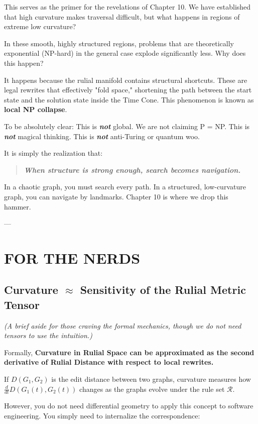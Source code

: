 This serves as the primer for the revelations of Chapter 10. We have established that high curvature makes traversal difficult, but what happens in regions of extreme low curvature?

In these smooth, highly structured regions, problems that are theoretically exponential (NP-hard) in the general case explode significantly less. Why does this happen?

It happens because the rulial manifold contains structural shortcuts. These are legal rewrites that effectively "fold space," shortening the path between the start state and the solution state inside the Time Cone. This phenomenon is known as \textbf{local NP collapse}.

To be absolutely clear:
This is \textbf{\textit{not}} global. We are not claiming P = NP.
This is \textbf{\textit{not}} magical thinking.
This is \textbf{\textit{not}} anti-Turing or quantum woo.

It is simply the realization that:

\begin{quote}
\itshape
\textbf{When structure is strong enough, search becomes navigation.}
\end{quote}

In a chaotic graph, you must search every path. In a structured, low-curvature graph, you can navigate by landmarks. Chapter 10 is where we drop this hammer.

---

\section*{FOR THE NERDS }

\subsection{Curvature $\approx$ Sensitivity of the Rulial Metric Tensor}

\textit{(A brief aside for those craving the formal mechanics, though we do not need tensors to use the intuition.)}

Formally, \textbf{Curvature in Rulial Space can be approximated as the second derivative of Rulial Distance with respect to local rewrites.}

If $D(G_1, G_2)$ is the edit distance between two graphs, curvature measures how $\frac{d}{dt} D(G_1(t), G_2(t))$ changes as the graphs evolve under the rule set $\mathcal{R}$.

However, you do not need differential geometry to apply this concept to software engineering. You simply need to internalize the correspondence:

